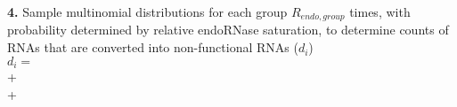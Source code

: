 \documentclass[12pt]{article}
\begin{document}
\begin{algorithm}
\textbf{4.} Sample multinomial distributions for each group $R_{endo,group}$ times, with probability determined by relative endoRNase saturation, to determine counts of RNAs that are converted into non-functional RNAs ($d_{i}$)\\
    \-\hspace{1cm} $d_{i} =$  \\
    \-\hspace{1.9cm} +  \\
    \-\hspace{1.9cm} +  \\

\end{algorithm}
\newpage
\end{document}
